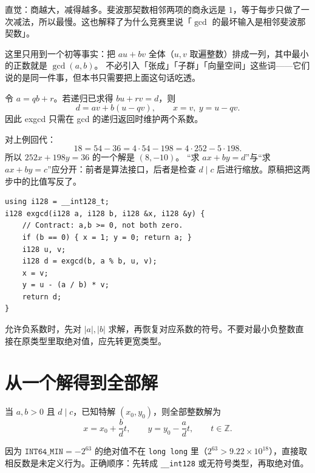 \documentclass[UTF8,a4paper,11pt,twoside,openright,fontset=fandol]{ctexbook}
\theoremstyle{definition}
\newcommand{\Z}{\mathbb Z}
\begin{document}
\begin{tip}
直觉：商越大，减得越多。斐波那契数相邻两项的商永远是 $1$，等于每步只做了一次减法，所以最慢。这也解释了为什么竞赛里说「$\gcd$ 的最坏输入是相邻斐波那契数」。
\end{tip}

这里只用到一个初等事实：把 $au+bv$ 全体（$u,v$ 取遍整数）排成一列，其中最小的正数就是 $\gcd(a,b)$。
不必引入「张成」「子群」「向量空间」这些词——它们说的是同一件事，但本书只需要把上面这句话吃透。

令 $a=qb+r$。若递归已求得 $bu+rv=d$，则
\[
 d=av+b(u-qv),\qquad x=v,\ y=u-qv.
\]
因此 exgcd 只需在 gcd 的递归返回时维护两个系数。


对上例回代：
\[
18=54-36=4\cdot54-198=4\cdot252-5\cdot198.
\]
所以 $252x+198y=36$ 的一个解是 $(8,-10)$。
“求 $ax+by=d$”与“求 $ax+by=c$”应分开：前者是算法接口，后者是检查 $d\mid c$ 后进行缩放。原稿把这两步中的比值写反了。
\begin{lstlisting}
using i128 = __int128_t;
i128 exgcd(i128 a, i128 b, i128 &x, i128 &y) {
    // Contract: a,b >= 0, not both zero.
    if (b == 0) { x = 1; y = 0; return a; }
    i128 u, v;
    i128 d = exgcd(b, a % b, u, v);
    x = v;
    y = u - (a / b) * v;
    return d;
}
\end{lstlisting}
允许负系数时，先对 $|a|,|b|$ 求解，再恢复对应系数的符号。不要对最小负整数直接在原类型里取绝对值，应先转更宽类型。


\section{从一个解得到全部解}
当 $a,b>0$ 且 $d\mid c$，已知特解 $(x_0,y_0)$，则全部整数解为
\[
 x=x_0+\frac bd t,\qquad y=y_0-\frac ad t,\qquad t\in\Z.
\]

\begin{tip}
因为 $\texttt{INT64\_MIN}=-2^{63}$ 的绝对值不在 \texttt{long long} 里（$2^{63}>9.22\times10^{18}$），直接取相反数是未定义行为。正确顺序：先转成 \texttt{\_\_int128} 或无符号类型，再取绝对值。
\end{tip}
\end{document}
